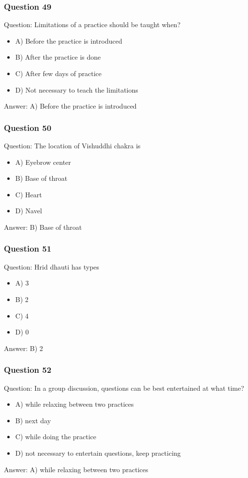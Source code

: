 \begin{frame}[fragile]\frametitle{Question 49}
Question: Limitations of a practice should be taught when?
\begin{itemize}
\item A) Before the practice is introduced
\item B) After the practice is done
\item C) After few days of practice
\item D) Not necessary to teach the limitations
\end{itemize}
Answer: A) Before the practice is introduced
\end{frame}

\begin{frame}[fragile]\frametitle{Question 50}
Question: The location of Vishuddhi chakra is
\begin{itemize}
\item A) Eyebrow center
\item B) Base of throat
\item C) Heart
\item D) Navel
\end{itemize}
Answer: B) Base of throat
\end{frame}

\begin{frame}[fragile]\frametitle{Question 51}
Question: Hrid dhauti has types
\begin{itemize}
\item A) 3
\item B) 2
\item C) 4
\item D) 0
\end{itemize}
Answer: B) 2
\end{frame}

\begin{frame}[fragile]\frametitle{Question 52}
Question: In a group discussion, questions can be best entertained at what time?
\begin{itemize}
\item A) while relaxing between two practices
\item B) next day
\item C) while doing the practice
\item D) not necessary to entertain questions, keep practicing
\end{itemize}
Answer: A) while relaxing between two practices
\end{frame}

